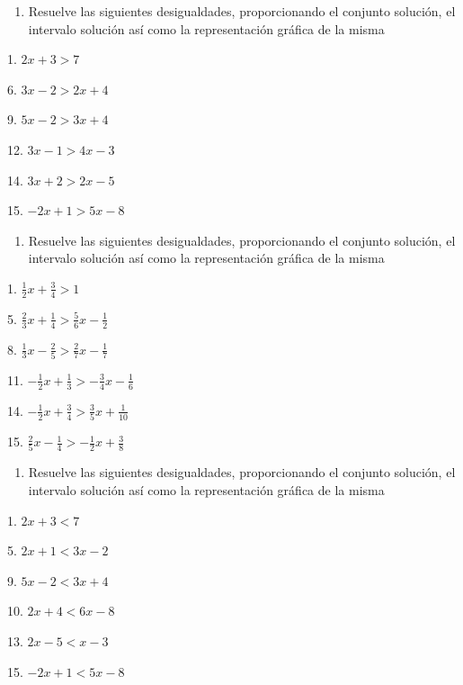 \documentclass[]{book}
\providecommand{\tightlist}{%
  \setlength{\itemsep}{0pt}\setlength{\parskip}{0pt}}
\begin{document}
\begin{enumerate}
\def\labelenumi{\arabic{enumi}.}
\setcounter{enumi}{5}
\tightlist
\item
  Resuelve las siguientes desigualdades, proporcionando el conjunto
  solución, el intervalo solución así como la representación gráfica de
  la misma
\end{enumerate}

\begin{multicols}{2}
1. $2x+3>7$

6. $3x-2>2x+4$

9. $5x-2>3x+4$

12. $3x-1>4x-3$

14. $3x+2>2x-5$

15. $-2x+1>5x-8$
\end{multicols}

\begin{enumerate}
\def\labelenumi{\arabic{enumi}.}
\setcounter{enumi}{6}
\tightlist
\item
  Resuelve las siguientes desigualdades, proporcionando el conjunto
  solución, el intervalo solución así como la representación gráfica de
  la misma
\end{enumerate}

\begin{multicols}{2}    
1. $\frac{1}{2}x+\frac{3}{4}>1$

5. $\frac{2}{3}x+\frac{1}{4}>\frac{5}{6}x-
\frac{1}{2}$

8. $\frac{1}{3}x-\frac{2}{5}>\frac{2}{7}x-
\frac{1}{7}$

11. $-\frac{1}{2}x+\frac{1}{3}>-\frac{3}{4}x-\frac{1}{6}$

14. $-\frac{1}{2}x+\frac{3}{4}>\frac{3}{5}x+\frac{1}{10}$

15. $\frac{2}{5}x-\frac{1}{4}>-\frac{1}{2}x+\frac{3}{8}$
\end{multicols}

\begin{enumerate}
\def\labelenumi{\arabic{enumi}.}
\setcounter{enumi}{7}
\tightlist
\item
  Resuelve las siguientes desigualdades, proporcionando el conjunto
  solución, el intervalo solución así como la representación gráfica de
  la misma
\end{enumerate}

\begin{multicols}{2}
1. $2x+3<7$

5. $2x+1<3x-2$

9. $5x-2<3x+4$

10. $2x+4<6x-8$

13. $2x-5<x-3$

15. $-2x+1<5x-8$
\end{multicols}
\end{document}
